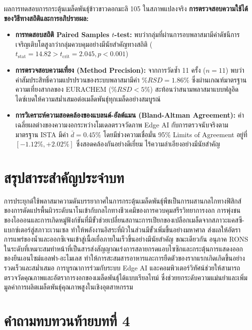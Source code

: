 \begin{agribox}{ผลการทดสอบการกระตุ้นเมล็ดพันธุ์ข้าวขาวดอกมะลิ 105 ในสภาพแปลงจริง}
\textbf{การตรวจสอบความใช้ได้ของวิธีทางสถิติและการอภิปรายผล:}
\begin{itemize}
    \item \textbf{การทดสอบสถิติ Paired Samples $t$-test:} พบว่ากลุ่มที่ผ่านการอบพลาสมามีค่าดัชนีการเจริญเติบโตสูงกว่ากลุ่มควบคุมอย่างมีนัยสำคัญทางสถิติ ($t_{\text{stat}} = 14.82 > t_{\text{crit}} = 2.045, p < 0.001$) 
    \item \textbf{การตรวจสอบความเที่ยง (Method Precision):} จากการวัดซ้ำ 11 ครั้ง ($n=11$) พบว่าค่าสัมประสิทธิ์ความแปรปรวนของระบบพลาสมามีค่า $\%RSD = 1.86\%$ ซึ่งผ่านเกณฑ์มาตรฐานความเที่ยงสากลของ EURACHEM ($\%RSD < 5\%$) สะท้อนว่าสนามพลาสมาแบบฟลูอิดไดซ์เบดให้ความสม่ำเสมอต่อเมล็ดพันธุ์ทุกเมล็ดอย่างสมบูรณ์
    \item \textbf{การวิเคราะห์ความสอดคล้องของแบลนด์-อัลต์แมน (Bland-Altman Agreement):} ค่าเฉลี่ยผลต่างของความงอกระหว่างโมเดลตรวจวัดภาพ Edge AI กับการตรวจนับจริงตามมาตรฐาน ISTA มีค่า $\bar{d} = 0.45\%$ โดยมีช่วงความเชื่อมั่น 95\% Limits of Agreement อยู่ที่ $[-1.12\%, +2.02\%]$ ซึ่งสอดคล้องกันอย่างดีเยี่ยม ไร้ความลำเอียงอย่างมีนัยสำคัญ
\end{itemize}
\end{agribox}

\section{สรุปสาระสำคัญประจำบท}

การประยุกต์ใช้พลาสมาความดันบรรยากาศในการกระตุ้นเมล็ดพันธุ์พืชเป็นการผสานกลไกทางฟิสิกส์ของการดัดแปรพื้นผิวระดับนาโนเข้ากับกลไกทางชีวเคมีของการควบคุมสรีรวิทยาการงอก การพุ่งชนของไอออนและการเกิดหมู่ฟังก์ชันที่มีขั้วช่วยเปลี่ยนสถานะการเปียกของเปลือกเมล็ดจากสภาวะแคสซี-แบกซ์เตอร์สู่สภาวะเวนเซล ทำให้พลังงานอิสระที่ผิวในส่วนมีขั้วเพิ่มขึ้นอย่างมหาศาล ส่งผลให้อัตราการแพร่ของน้ำและออกซิเจนเข้าสู่เนื้อเยื่อภายในเร็วขึ้นอย่างมีนัยสำคัญ ขณะเดียวกัน อนุภาค RONS ในระดับที่เหมาะสมทำหน้าที่เป็นสารส่งสัญญาณเร่งการสลายกรดแอบไซซิกและกระตุ้นการแสดงออกของยีนเอนไซม์แอลฟา-อะไมเลส ทำให้การสะสมสารอาหารและการยืดตัวของรากแรกเกิดเกิดขึ้นอย่างรวดเร็วและสม่ำเสมอ การบูรณาการร่วมกับระบบ Edge AI และคอมพิวเตอร์วิทัศน์ช่วยให้สามารถตรวจวัดคุณภาพและอัตราการงอกของเมล็ดพันธุ์ได้แบบเรียลไทม์ ซึ่งช่วยยกระดับความแม่นยำและเพิ่มมูลค่าการผลิตเมล็ดพันธุ์คุณภาพสูงในเชิงอุตสาหกรรม

\section{คำถามทบทวนท้ายบทที่ 4}

